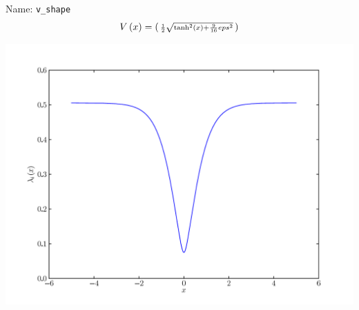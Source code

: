 \documentclass[a4paper,10pt]{report}
\begin{document}
\begin{minipage}{0.5\linewidth}
  Name:    \texttt{v\_shape}
  \begin{equation*}
    V\left( x \right) = \left(\begin{smallmatrix}\frac{1}{2} \sqrt{\operatorname{tanh}^{2}\left(x\right) + \frac{9}{16} eps^{2}}\end{smallmatrix}\right)
  \end{equation*}
\end{minipage}
\begin{minipage}{0.5\linewidth}
  \begin{center}
    \includegraphics[scale=0.25]{./fig/v_shape.pdf}
  \end{center}
\end{minipage}
\end{document}
